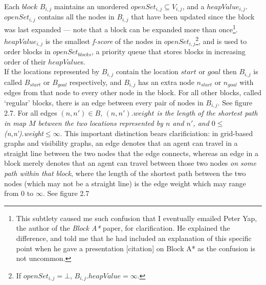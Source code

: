 \documentclass[12pt,notitlepage]{report}
\begin{document}
\noindent
Each $block$ $B_{i,j}$ maintains an unordered $openSet_{i,j} \subseteq V_{i,j}$, and a $heapValue_{i,j}$. $openSet_{i,j}$ contains all the nodes in $B_{i,j}$ that have been updated since the block was last expanded --- note that a block can be expanded more than once\footnote{This subtlety caused me such confusion that I eventually emailed Peter Yap, the author of the {\em Block A*} paper, for clarification. He explained the difference, and told me that he had included an explanation of this specific point when he gave a presentation [citation] on Block A* as the confusion is not uncommon.}. $heapValue_{i,j}$ is the smallest {\em f-score} of the nodes in $openSet_{i,j}$\footnote{If $openSet_{i,j} = \bot$, $B_{i,j}.heapValue = \infty$.}, and is used to order blocks in $openSet_{blocks}$, a priority queue that stores blocks in increasing order of their $heapValue$s.\\

\noindent
If the locations represented by $B_{i,j}$ contain the location $start$ or $goal$ then $B_{i,j}$ is called $B_{start}$ or $B_{goal}$ respectively, and $B_{i,j}$ has an extra node $n_{start}$ or $n_{goal}$ with edges from that node to every other node in the block. For all other blocks, called `regular' blocks, there is an edge between every pair of nodes in $B_{i,j}$. See figure 2.7. For all edges $(n,n') \in B$, {\em $(n,n').weight$ is the length of the shortest path in map $M$ between the two locations represented by $n$ and $n'$, and $0 \leq $(n,n').weight$ \leq \infty$}. This important distinction bears clarificiation: in grid-based graphs and visibility graphs, an edge denotes that an agent can travel in a straight line between the two nodes that the edge connects, whereas an edge in a block merely denotes that an agent can travel between those two nodes {\em on some path within that block}, where the length of the shortest path between the two nodes (which may not be a straight line) is the edge weight which may range from $0$ to $\infty$. See figure 2.7\\
\end{document}
